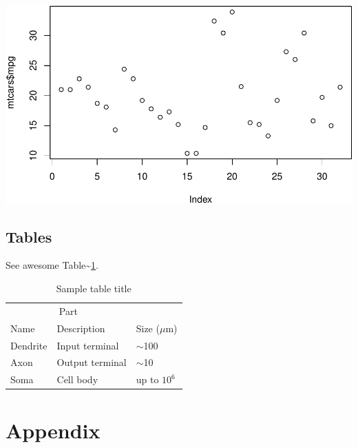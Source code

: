 \documentclass{article}
\newenvironment{Shaded}{\begin{snugshade}}{\end{snugshade}}
\newcommand{\KeywordTok}[1]{\textcolor[rgb]{0.13,0.29,0.53}{\textbf{#1}}}
\newcommand{\NormalTok}[1]{#1}
\newcommand{\OperatorTok}[1]{\textcolor[rgb]{0.81,0.36,0.00}{\textbf{#1}}}
\begin{document}
\begin{Shaded}
\end{Shaded}

\includegraphics{preprint_files/figure-latex/unnamed-chunk-1-1.pdf}

\hypertarget{tables}{%
\subsection{Tables}\label{tables}}

\lipsum[12]

See awesome Table\textasciitilde{}\ref{tab:table}.

\begin{table}
 \caption{Sample table title}
  \centering
  \begin{tabular}{lll}
    \toprule
    \multicolumn{2}{c}{Part}                   \\
    \cmidrule(r){1-2}
    Name     & Description     & Size ($\mu$m) \\
    \midrule
    Dendrite & Input terminal  & $\sim$100     \\
    Axon     & Output terminal & $\sim$10      \\
    Soma     & Cell body       & up to $10^6$  \\
    \bottomrule
  \end{tabular}
  \label{tab:table}
\end{table}

\hypertarget{appendix}{%
\section{Appendix}\label{appendix}}
\end{document}
